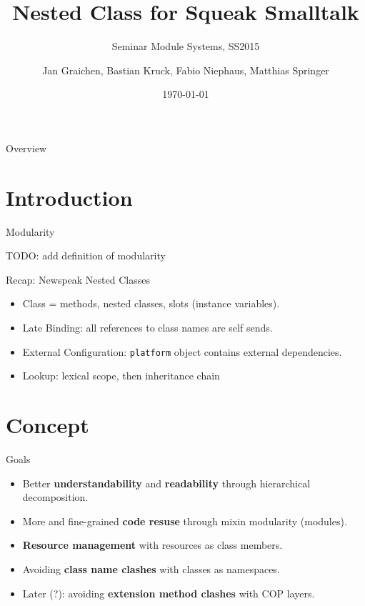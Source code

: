 \documentclass[xcolor=dvipsname, handout]{beamer} %
\title{Nested Class for Squeak Smalltalk}
\subtitle{Seminar Module Systems, SS2015}
\author{Jan Graichen, Bastian Kruck, Fabio Niephaus, Matthias Springer}
\date{\today}
\institute[2012]{Hasso Plattner Institute, Software Architecture Group}
\begin{document}
\begin{frame}[plain]
	\maketitle
\end{frame}
\begin{frame}{Overview}
	\tableofcontents[hideallsubsections]
\end{frame}


\section{Introduction}

\begin{frame}{Modularity}
\begin{table}
TODO: add definition of modularity
\end{table}
\end{frame}

\begin{frame}{Recap: Newspeak Nested Classes}
  \begin{itemize}
    \item Class = methods, nested classes, slots (instance variables).
    \item Late Binding: all references to class names are self sends.
    \item External Configuration: \texttt{platform} object contains external dependencies.
    \item Lookup: lexical scope, then inheritance chain
  \end{itemize}
\end{frame}

\section{Concept}
\begin{frame}{Goals}
  \begin{itemize}
    \item Better \textbf{understandability} and \textbf{readability} through hierarchical decomposition.
    \item More and fine-grained \textbf{code resuse} through mixin modularity (modules).
    \item \textbf{Resource management} with resources as class members.
    \item Avoiding \textbf{class name clashes} with classes as namespaces.
    \item Later (?): avoiding \textbf{extension method clashes} with COP layers.
  \end{itemize}
\end{frame}
\end{document}
